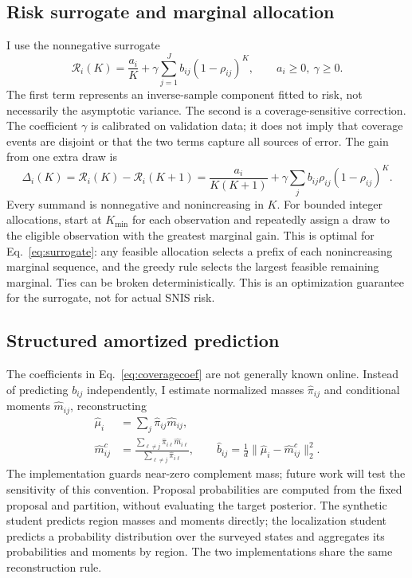 \documentclass[10pt,letterpaper]{article}
\newcommand{\norm}[1]{\lVert #1\rVert_2}
\begin{document}
\subsection{Risk surrogate and marginal allocation}
I use the nonnegative surrogate
\begin{equation}
 \boxed{\mathcal R_i(K)=\frac{a_i}{K}+\gamma\sum_{j=1}^{J} b_{ij}(1-\rho_{ij})^K,\qquad a_i\ge0,\ \gamma\ge0.}\label{eq:surrogate}
\end{equation}
The first term represents an inverse-sample component fitted to risk, not necessarily the asymptotic variance. The second is a coverage-sensitive correction. The coefficient $\gamma$ is calibrated on validation data; it does not imply that coverage events are disjoint or that the two terms capture all sources of error. The gain from one extra draw is
\begin{equation}
 \Delta_i(K)=\mathcal R_i(K)-\mathcal R_i(K+1)=\frac{a_i}{K(K+1)}+\gamma\sum_j b_{ij}\rho_{ij}(1-\rho_{ij})^K.\label{eq:marginal}
\end{equation}
Every summand is nonnegative and nonincreasing in $K$. For bounded integer allocations, start at $K_{\min}$ for each observation and repeatedly assign a draw to the eligible observation with the greatest marginal gain. This is optimal for Eq.~\eqref{eq:surrogate}: any feasible allocation selects a prefix of each nonincreasing marginal sequence, and the greedy rule selects the largest feasible remaining marginal. Ties can be broken deterministically. This is an optimization guarantee for the surrogate, not for actual SNIS risk.
\subsection{Structured amortized prediction}
The coefficients in Eq.~\eqref{eq:coveragecoef} are not generally known online. Instead of predicting $b_{ij}$ independently, I estimate normalized masses $\widehat\pi_{ij}$ and conditional moments $\widehat m_{ij}$, reconstructing
\begin{align}
 \widehat\mu_i&=\sum_j\widehat\pi_{ij}\widehat m_{ij},\\
 \widehat m_{ij}^{c}&=\frac{\sum_{\ell\ne j}\widehat\pi_{i\ell}\widehat m_{i\ell}}{\sum_{\ell\ne j}\widehat\pi_{i\ell}},\qquad
 \widehat b_{ij}=\frac1d\norm{\widehat\mu_i-\widehat m_{ij}^{c}}^2.\label{eq:reconstruct}
\end{align}
The implementation guards near-zero complement mass; future work will test the sensitivity of this convention. Proposal probabilities are computed from the fixed proposal and partition, without evaluating the target posterior. The synthetic student predicts region masses and moments directly; the localization student predicts a probability distribution over the surveyed states and aggregates its probabilities and moments by region. The two implementations share the same reconstruction rule.
\end{document}
